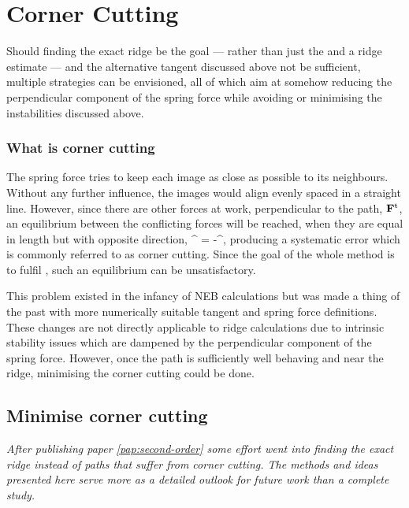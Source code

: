 \section{Corner Cutting}
\label{sec:erm-corner-cutting}
Should finding the exact ridge be the goal --- rather than just the  and a ridge estimate --- and the alternative tangent discussed above not be sufficient, multiple strategies can be envisioned, all of which aim at somehow reducing the perpendicular component of the spring force while avoiding or minimising the instabilities discussed above.

\subsubsection{What is corner cutting}
The spring force tries to keep each image as close as possible to its neighbours.
Without any further influence, the images would align evenly spaced in a straight line.
However, since there are other forces at work, perpendicular to the path, ${\mathrm{\mathbf{\bm{F}}}}^\text{t}$, an equilibrium between the conflicting forces will be reached, when they are equal in length but with opposite direction,
\vF^{\perp} = -\vF^,
\eeq
producing a systematic error which is commonly referred to as corner cutting.
Since the goal of the whole method is to fulfil , such an equilibrium can be unsatisfactory.

This problem existed in the infancy of NEB calculations but was made a thing of the past with more numerically suitable tangent and spring force definitions.~\cite{neb-tangent-2000}
These changes are not directly applicable to ridge calculations due to intrinsic stability issues which are dampened by the perpendicular component of the spring force.
However, once the path is sufficiently well behaving and near the ridge, minimising the corner cutting could be done.


\subsection{Minimise corner cutting}
\textit{After publishing paper \ref{pap:second-order} some effort went into finding the exact ridge instead of paths that suffer from corner cutting.
The methods and ideas presented here serve more as a detailed outlook for future work than a complete study.}
\vspace{1em}


